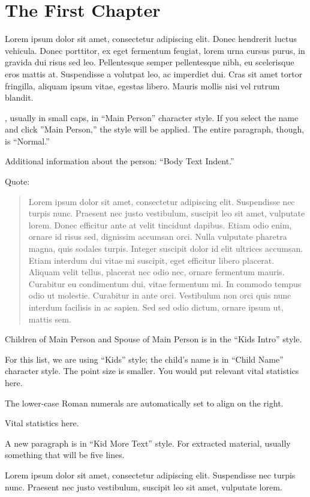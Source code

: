 \chapter{The First Chapter}

 Lorem ipsum dolor sit amet, consectetur adipiscing elit. Donec hendrerit luctus vehicula. Donec porttitor, ex eget fermentum feugiat, lorem urna cursus purus, in gravida dui risus sed leo. Pellentesque semper pellentesque nibh, eu scelerisque eros mattis at. Suspendisse a volutpat leo, ac imperdiet dui. Cras sit amet tortor fringilla, aliquam ipsum vitae, egestas libero. Mauris mollis nisi vel rutrum blandit. 

, usually in small caps, in ``Main Person'' character style. If you select the name and click ''Main Person,'' the style will be applied. The entire paragraph, though, is ``Normal.''
	
Additional information about the person: ``Body Text Indent.''

Quote:

\begin{quote}
	Lorem ipsum dolor sit amet, consectetur adipiscing elit. Suspendisse nec turpis nunc. Praesent nec justo vestibulum, suscipit leo sit amet, vulputate lorem. Donec efficitur ante at velit tincidunt dapibus. Etiam odio enim, ornare id risus sed, dignissim accumsan orci. Nulla vulputate pharetra magna, quis sodales turpis. Integer suscipit dolor id elit ultrices accumsan. Etiam interdum dui vitae mi suscipit, eget efficitur libero placerat. Aliquam velit tellus, placerat nec odio nec, ornare fermentum mauris. Curabitur eu condimentum dui, vitae fermentum mi. In commodo tempus odio ut molestie. Curabitur in ante orci. Vestibulum non orci quis nunc interdum facilisis in ac sapien. Sed sed odio dictum, ornare ipsum ut, mattis sem. 
\end{quote}

\begin{KidsIntro}
	Children of Main Person and Spouse of Main Person is in the ``Kids Intro'' style.
\end{KidsIntro}

\begin{Kids}

	 For this list, we are using ``Kids'' style; the child's name is in ``Child Name'' character style. The point size is smaller. You would put relevant vital statistics here.
	
	 The lower-case Roman numerals are automatically set to align on the right.
	
	 Vital statistics here.
	
	\begin{KidsMoreText}A new paragraph is in ``Kid More Text'' style. For extracted material, usually something that will be five lines.\end{KidsMoreText}

\end{Kids}

\begin{Grandkids}	
	  Lorem ipsum dolor sit amet, consectetur adipiscing elit. Suspendisse nec turpis nunc. Praesent nec justo vestibulum, suscipit leo sit amet, vulputate lorem.
\end{Grandkids}



